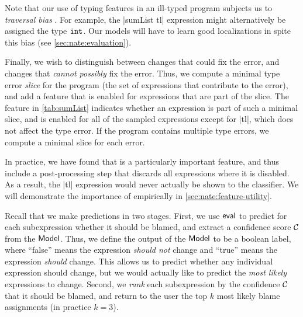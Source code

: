 Note that our use of typing features in an ill-typed program subjects us
to \emph{traversal bias} \citep{McAdam1998-ub}. For example, the
|sumList tl| expression might alternatively be assigned the type
$\mathtt{int}$.
%
Our models will have to learn good localizations in spite this bias (see
\autoref{sec:nate:evaluation}).

Finally, we wish to distinguish between changes that could fix the
error, and changes that \emph{cannot possibly} fix the error.
%
Thus, we compute a minimal type error \emph{slice} for the program
(\ie the set of expressions that contribute to the error), and add a
feature that is enabled for expressions that are part of the slice.
%
The \InSlice feature in \autoref{tab:sumList} indicates whether an
expression is part of such a minimal slice, and is enabled for all of
the sampled expressions except for |tl|, which does not affect
the type error.
%
If the program contains multiple type errors, we compute
a minimal slice for each error.

In practice, we have found that \InSlice is a particularly important
feature, and thus include a post-processing step that discards all
expressions where it is disabled.
%
As a result, the |tl| expression would never actually be shown to the
classifier.
%
 We will demonstrate the importance of \InSlice empirically in
\autoref{sec:nate:feature-utility}.

\label{sec:nate:labels}
Recall that we make predictions in two stages.
%
First, we use $\mathsf{eval}$ to predict for each subexpression whether it
should be blamed, and extract a confidence score $\mathcal{C}$ from the
$\mathsf{Model}$.
%
Thus, we define the output of the $\mathsf{Model}$ to be a boolean label, where
``false'' means the expression \emph{should not} change and ``true''
means the expression \emph{should} change.
%
This allows us to predict whether any individual expression should
change, but we would actually like to predict the \emph{most likely}
expressions to change.
%
Second, we \emph{rank} each subexpression by the confidence $\mathcal{C}$
that it should be blamed, and return to the user the top $k$
most likely blame assignments (in practice $k=3$).


